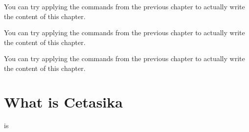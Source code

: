 You can try applying the commands from the previous chapter to actually write the content of this chapter.

You can try applying the commands from the previous chapter to actually write the content of this chapter.

You can try applying the commands from the previous chapter to actually write the content of this chapter.

\section{What is Cetasika}
 is  

\commentarytable%